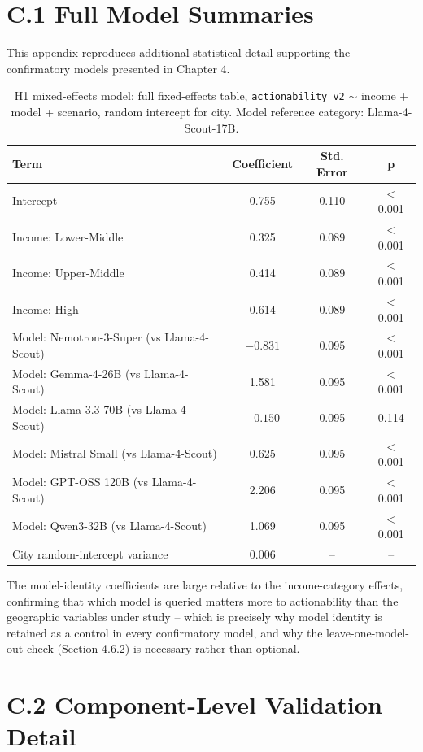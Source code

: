 \section*{C.1 Full Model Summaries}

This appendix reproduces additional statistical detail supporting the confirmatory models presented in Chapter 4.

\begin{table}[H]
\centering
\caption{H1 mixed-effects model: full fixed-effects table, \texttt{actionability\_v2} $\sim$ income + model + scenario, random intercept for city. Model reference category: Llama-4-Scout-17B.}
\begin{tabular}{lccc}
\toprule
Term & Coefficient & Std. Error & p \\
\midrule
Intercept & 0.755 & 0.110 & $<$0.001 \\
Income: Lower-Middle & 0.325 & 0.089 & $<$0.001 \\
Income: Upper-Middle & 0.414 & 0.089 & $<$0.001 \\
Income: High & 0.614 & 0.089 & $<$0.001 \\
Model: Nemotron-3-Super (vs Llama-4-Scout) & $-0.831$ & 0.095 & $<$0.001 \\
Model: Gemma-4-26B (vs Llama-4-Scout) & 1.581 & 0.095 & $<$0.001 \\
Model: Llama-3.3-70B (vs Llama-4-Scout) & $-0.150$ & 0.095 & 0.114 \\
Model: Mistral Small (vs Llama-4-Scout) & 0.625 & 0.095 & $<$0.001 \\
Model: GPT-OSS 120B (vs Llama-4-Scout) & 2.206 & 0.095 & $<$0.001 \\
Model: Qwen3-32B (vs Llama-4-Scout) & 1.069 & 0.095 & $<$0.001 \\
City random-intercept variance & 0.006 & -- & -- \\
\bottomrule
\end{tabular}
\end{table}

The model-identity coefficients are large relative to the income-category effects, confirming that which model is queried matters more to actionability than the geographic variables under study -- which is precisely why model identity is retained as a control in every confirmatory model, and why the leave-one-model-out check (Section 4.6.2) is necessary rather than optional.

\section*{C.2 Component-Level Validation Detail}

